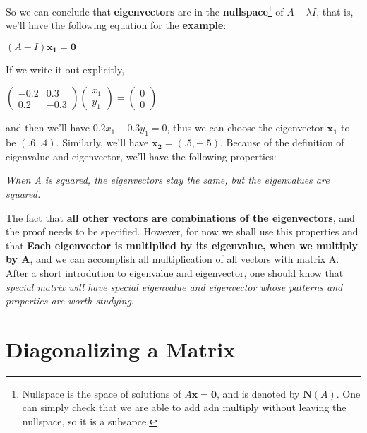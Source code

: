 \documentclass[12pt]{article}
\begin{document}
So we can conclude that \textbf{eigenvectors} are in the \textbf{nullspace}\footnote{Nullspace is the space of solutions of $A\mathbf{x} = \mathbf{0}$, and is denoted by $\mathbf{N}(A)$. One can simply check that we are able to add adn multiply without leaving the nullspace, so it is a subsapce.} of $A- \lambda I$, that is, we'll have the following equation for the \textbf{example}:

\begin{center}
    $(A-I)\mathbf{x_{1} = \mathbf{0}}$
\end{center}

If we write it out explicitly,

\begin{center}
    $\begin{pmatrix}
        -0.2 & 0.3 \\
        0.2 & -0.3
    \end{pmatrix} \begin{pmatrix}
        x_1\\
        y_1
    \end{pmatrix}= \begin{pmatrix}
        0\\
        0
    \end{pmatrix}$
\end{center}

and then we'll have $0.2x_1 - 0.3y_1 = 0$, thus we can choose the eigenvector $\mathbf{x_{1}}$ to be $(.6, .4)$. Similarly, we'll have $\mathbf{x_{2}} = (.5, -.5)$.
Because of the definition of eigenvalue and eigenvector, we'll have the following properties:

\begin{center}
    \textit{When A is squared, the eigenvectors stay the same, but the eigenvalues are squared.}
\end{center}

The fact that \textbf{all other vectors are combinations of the eigenvectors}, and the proof needs to be specified. However, for now we shall use this properties and that \textbf{Each eigenvector is multiplied by its eigenvalue, when we multiply by A}, and we can accomplish all multiplication of all vectors with matrix A. After a short introdution to eigenvalue and eigenvector, one should know that \textit{special matrix will have special eigenvalue and eigenvector whose patterns and properties are worth studying}.

\section{Diagonalizing a Matrix}
\end{document}
